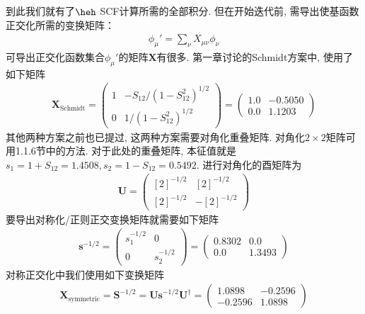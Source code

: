 到此我们就有了$\heh$ SCF计算所需的全部积分. 
但在开始迭代前, 
需导出使基函数正交化所需的变换矩阵：
\begin{align}
	\phi_\mu'=\sum_\nu X_{\mu\nu}\phi_\nu
\end{align}
可导出正交化函数集合$\phi_\mu'$的矩阵$\mathbf{X}$有很多. 
第一章讨论的Schmidt方案中, 
使用了如下矩阵
\begin{align}
	\mathbf{X}_\mathrm{Schmidt} = 
	\begin{pmatrix}
		1 & -S_{12}/(1-S_{12}^2)^{1/2} \\
		0 & 1/(1-S_{12}^2)^{1/2}
	\end{pmatrix}=
	\begin{pmatrix}
		1.0 & -0.5050 \\
		0.0 & 1.1203
	\end{pmatrix}
\end{align}
其他两种方案之前也已提过, 
这两种方案需要对角化重叠矩阵. 
对角化$2\times2$矩阵可用1.1.6节中的方法. 
对于此处的重叠矩阵, 
本征值就是$s_1=1+S_{12}=1.4508,s_2=1-S_{12}=0.5492$. 
进行对角化的酉矩阵为
\begin{align}
	\mathbf{U}=
	\begin{pmatrix}
		[2]^{-1/2}&[2]^{-1/2}\\
		[2]^{-1/2}&-[2]^{-1/2}
	\end{pmatrix}
\end{align}
要导出对称化/正则正交变换矩阵就需要如下矩阵
\begin{align}
	\mathbf{s}^{-1/2}=
	\begin{pmatrix}
		s_1^{-1/2}&0\\0&s_2^{-1/2}
	\end{pmatrix}=
	\begin{pmatrix}
		0.8302&0.0\\0.0&1.3493
	\end{pmatrix}
\end{align}
对称正交化中我们使用如下变换矩阵
\begin{align}
	\mathbf{X}_\mathrm{symmetric} = \mathbf{S}^{-1/2}=\mathbf{Us}^{-1/2}\mathbf{U^\dagger}=
	\begin{pmatrix}
		1.0898&-0.2596\\-0.2596&1.0898
	\end{pmatrix}
\end{align}
